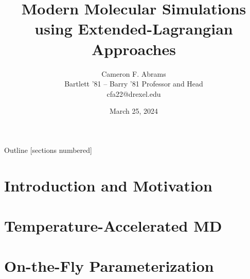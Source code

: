 \documentclass[10pt]{beamer}
\title{Modern Molecular Simulations using Extended-Lagrangian Approaches}
\date{March 25, 2024}
\author{Cameron F. Abrams\\Bartlett '81 -- Barry '81 Professor and Head\\cfa22@drexel.edu}
\institute{Drexel University, Department of Chemical and Biological Engineering}
\begin{document}
\maketitle

\begin{frame}{Outline}
  [sections numbered]
  \tableofcontents[hideallsubsections]
\end{frame}

\section{Introduction and Motivation}











\section{Temperature-Accelerated MD}





\section{On-the-Fly Parameterization}















\end{document}
